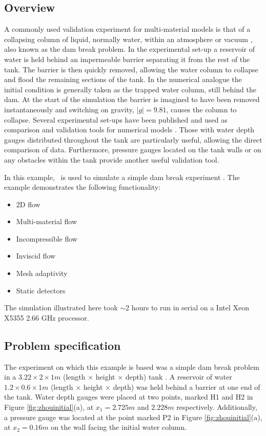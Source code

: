 \subsection{Overview}
A commonly used validation experiment for multi-material models is that of a collapsing column of liquid, normally water, within an atmosphere or vacuum \citep{lakehal_interface_2002}, also known as the dam break problem.  In the experimental set-up a reservoir of water is held behind an impermeable barrier separating it from the rest of the tank.  The barrier is then quickly removed, allowing the water column to collapse and flood the remaining sections of the tank.  In the numerical analogue the initial condition is generally taken as the trapped water column, still behind the dam.  At the start of the simulation the barrier is imagined to have been removed instantaneously and switching on gravity, $|g| = 9.81$, causes the column to collapse.   Several experimental set-ups have been published and used as comparison and validation tools for numerical models \citep{martin_part_1952, greaves_simulation_2006}.  Those with water depth gauges distributed throughout the tank are particularly useful, allowing the
direct comparison of data.  Furthermore, pressure gauges located on the tank walls or on any obstacles within the tank provide another useful validation tool.

In this example, \fluidity\ is used to simulate a simple dam break experiment \citep{zhou_nonlinear_1999}.  The example demonstrates the following functionality:

\begin{itemize}
\item 2D flow
\item Multi-material flow
\item Incompressible flow
\item Inviscid flow
\item Mesh adaptivity
\item Static detectors
\end{itemize}

The simulation illustrated here took $\sim$2 hours to run in serial on a Intel Xeon X5355 2.66 GHz processor.

\subsection{Problem specification}
The experiment on which this example is based was a simple dam break problem in a $3.22\times2\times1m$ (length $\times$ height $\times$ depth) tank \citep{zhou_nonlinear_1999}.  A reservoir of water $1.2\times0.6\times1m$ (length $\times$ height $\times$ depth) was held behind a barrier at one end of the tank.  Water depth gauges were placed at two points, marked H1 and H2 in Figure \ref{fig:zhouinitial}(a), at $x_1 = 2.725m$ and $2.228m$ respectively.  Additionally, a pressure gauge was located at the point marked P2 in Figure \ref{fig:zhouinitial}(a), at $x_2=0.16m$ on the wall facing the initial water column.

